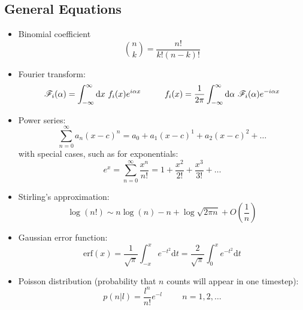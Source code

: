 \documentclass[../jaynes_prob_theory_notes.tex]{subfiles}
\begin{document}
\subsection{General Equations}
    \begin{itemize}
        \item Binomial coefficient
            \begin{equation*}
                \binom{n}{k} = \frac{n!}{k!(n-k)!}
            \end{equation*}
        \item Fourier transform:
            \begin{equation*}
                \mathscr{F}_{i}(\alpha) = \int^{\infty}_{-\infty} \mathrm{d}x~f_{i}(x)e^{i{\alpha}x} \hspace{1cm} f_{i}(x) = \frac{1}{2\pi} \int^{\infty}_{-\infty} \mathrm{d}{\alpha}~\mathscr{F}_{i}(\alpha)e^{-i{\alpha}x}
            \end{equation*}
        \item Power series:
            \begin{equation*}
                \sum^{\infty}_{n=0} a_{n}{(x-c)}^n = a_0 + a_{1}{(x-c)}^1 + a_{2}{(x-c)}^2 + \ldots
            \end{equation*}
            with special cases, such as for exponentials:
            \begin{equation*}
                e^x = \sum^{\infty}_{n=0} \frac{x^n}{n!} = 1 + \frac{x^2}{2!} + \frac{x^3}{3!} + \ldots
            \end{equation*}
        \item Stirling's approximation:
            \begin{equation*}
                \log (n!) \sim n \log (n) - n + \log \sqrt{2 \pi n} + O \left( \frac{1}{n} \right)
            \end{equation*}
        \item Gaussian error function:
            \begin{equation*} 
                \text{erf}(x) = \frac{1}{\sqrt{\pi}} \int^{x}_{-x} e^{-t^2} \text{d}t = \frac{2}{\sqrt{\pi}} \int^{x}_{0} e^{-t^2} \text{d}t
            \end{equation*}
        \item Poisson distribution (probability that \(n\) counts will appear in one timestep):\
            \begin{equation*} 
                p(n|l) = \frac{l^n}{n!}e^{-l} \hspace{1cm} n = 1, 2, \ldots
            \end{equation*}

\end{itemize}
\end{document}

